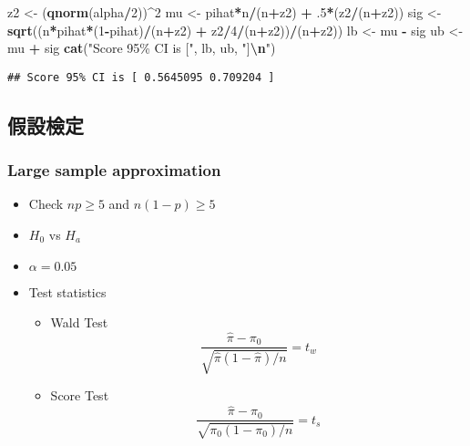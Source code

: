 \documentclass[
]{article}
\newenvironment{Shaded}{\begin{snugshade}}{\end{snugshade}}
\newcommand{\DecValTok}[1]{\textcolor[rgb]{0.00,0.00,0.81}{#1}}
\newcommand{\FunctionTok}[1]{\textcolor[rgb]{0.13,0.29,0.53}{\textbf{#1}}}
\newcommand{\NormalTok}[1]{#1}
\newcommand{\OtherTok}[1]{\textcolor[rgb]{0.56,0.35,0.01}{#1}}
\newcommand{\SpecialCharTok}[1]{\textcolor[rgb]{0.81,0.36,0.00}{\textbf{#1}}}
\newcommand{\StringTok}[1]{\textcolor[rgb]{0.31,0.60,0.02}{#1}}
\providecommand{\tightlist}{%
  \setlength{\itemsep}{0pt}\setlength{\parskip}{0pt}}
\begin{document}
\begin{Shaded}
\begin{Highlighting}[]
\NormalTok{z2 }\OtherTok{\textless{}{-}}\NormalTok{ (}\FunctionTok{qnorm}\NormalTok{(alpha}\SpecialCharTok{/}\DecValTok{2}\NormalTok{))}\SpecialCharTok{\^{}}\DecValTok{2}
\NormalTok{mu }\OtherTok{\textless{}{-}}\NormalTok{ pihat}\SpecialCharTok{*}\NormalTok{n}\SpecialCharTok{/}\NormalTok{(n}\SpecialCharTok{+}\NormalTok{z2) }\SpecialCharTok{+}\NormalTok{ .}\DecValTok{5}\SpecialCharTok{*}\NormalTok{(z2}\SpecialCharTok{/}\NormalTok{(n}\SpecialCharTok{+}\NormalTok{z2))}
\NormalTok{sig }\OtherTok{\textless{}{-}} \FunctionTok{sqrt}\NormalTok{((n}\SpecialCharTok{*}\NormalTok{pihat}\SpecialCharTok{*}\NormalTok{(}\DecValTok{1}\SpecialCharTok{{-}}\NormalTok{pihat)}\SpecialCharTok{/}\NormalTok{(n}\SpecialCharTok{+}\NormalTok{z2) }\SpecialCharTok{+}\NormalTok{ z2}\SpecialCharTok{/}\DecValTok{4}\SpecialCharTok{/}\NormalTok{(n}\SpecialCharTok{+}\NormalTok{z2))}\SpecialCharTok{/}\NormalTok{(n}\SpecialCharTok{+}\NormalTok{z2))}
\NormalTok{lb }\OtherTok{\textless{}{-}}\NormalTok{ mu }\SpecialCharTok{{-}}\NormalTok{ sig}
\NormalTok{ub }\OtherTok{\textless{}{-}}\NormalTok{ mu }\SpecialCharTok{+}\NormalTok{ sig}
\FunctionTok{cat}\NormalTok{(}\StringTok{"Score 95\% CI is ["}\NormalTok{, lb, ub, }\StringTok{"]}\SpecialCharTok{\textbackslash{}n}\StringTok{"}\NormalTok{)}
\end{Highlighting}
\end{Shaded}

\begin{verbatim}
## Score 95% CI is [ 0.5645095 0.709204 ]
\end{verbatim}

\hypertarget{ux5047ux8a2dux6aa2ux5b9a}{%
\subsection{假設檢定}\label{ux5047ux8a2dux6aa2ux5b9a}}

\hypertarget{large-sample-approximation}{%
\subsubsection{Large sample
approximation}\label{large-sample-approximation}}

\begin{itemize}
\item
  Check \(np \geq 5\) and \(n(1-p) \geq 5\)
\item
  \(H_0\) vs \(H_a\)
\item
  \(\alpha=0.05\)
\item
  Test statistics

  \begin{itemize}
  \tightlist
  \item
    Wald Test \[
      \frac{\hat{\pi} - \pi_0}{\sqrt{\hat{\pi} (1-\hat{\pi})/n}} = t_w
    \]
  \item
    Score Test \[
      \frac{\hat{\pi} - \pi_0}{\sqrt{\pi_0 (1-\pi_0)/n}} = t_s
    \]
  \end{itemize}
\end{itemize}
\end{document}
